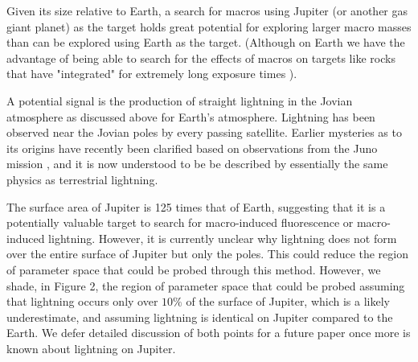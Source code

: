 \documentclass[%
 reprint,
 amsmath,amssymb,
 aps,
]{revtex4-2}
\begin{document}
    Given its size relative to Earth, a search for macros using Jupiter (or another gas giant planet) as the target  holds great potential for  exploring larger macro masses than can be explored using Earth as the target.  (Although on Earth we have the advantage of being able to search for the effects of macros on targets like rocks that have "integrated" for extremely long exposure times \cite{Sidhu2019granite}). 

    A potential signal is the production of straight lightning in the Jovian atmosphere as discussed above for Earth's atmosphere. Lightning has been observed near the Jovian poles by every passing satellite. Earlier mysteries as to its origins have recently been clarified based on observations from the Juno mission \cite{Brown2018}, and it is now understood to be be described by essentially the same physics as terrestrial lightning.

    The surface area of Jupiter is 125 times that of Earth, suggesting that it is a potentially valuable target to search for macro-induced fluorescence or macro-induced lightning. However, it is currently unclear why lightning does not form over the entire surface of Jupiter but only the poles. This could reduce the region of parameter space that could be probed through this method. However, we shade, in Figure 2, the region of parameter space that could be probed assuming that lightning occurs only over $10\%$ of the surface of Jupiter, which is a likely underestimate, and assuming lightning is identical on Jupiter compared to the Earth. We defer detailed discussion of both points for a future paper once more is known about lightning on Jupiter.
\end{document}
